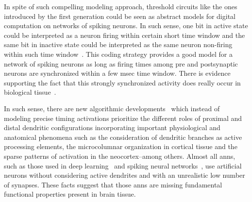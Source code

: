{In spite of such compelling modeling approach, threshold circuits like the ones introduced by the first generation could be seen as abstract models for digital computation on networks of spiking neurons. In such sense, one bit in active state could be interpreted as a neuron firing within certain short time window and the same bit in inactive state could be interpreted as the same neuron non-firing within such time window~\cite{Valiant:1994:CM:199266}. This coding strategy provides a good model for a network of spiking neurons as long as firing times among pre and postsynaptic neurons are synchronized within a few msec time window. There is evidence supporting the fact that this strongly synchronized activity does really occur in biological tissue~\cite{Abeles1993SpatiotemporalFP,bair1994}.

In such sense, there are new algorithmic developments~\cite{10.3389/fncir.2016.00023,10.1371/journal.pone.0217966} which instead of modeling precise timing activations prioritize the different roles of proximal and distal dendritic configurations incorporating important physiological and anatomical phenomena such as the consideration of dendritic branches as active processing elements, the microcolumnar organization in cortical tissue and the sparse patterns of activation in the neocortex--among others. Almost all \glspl{ann}, such as those used in deep learning~\cite{lecun_deep_2015} and spiking neural networks~\cite{MAASS19971659}, use artificial neurons without considering active dendrites and with an unrealistic low number of synapses. These facts suggest that those \glspl{ann} are missing fundamental functional properties present in brain tissue. 
}










